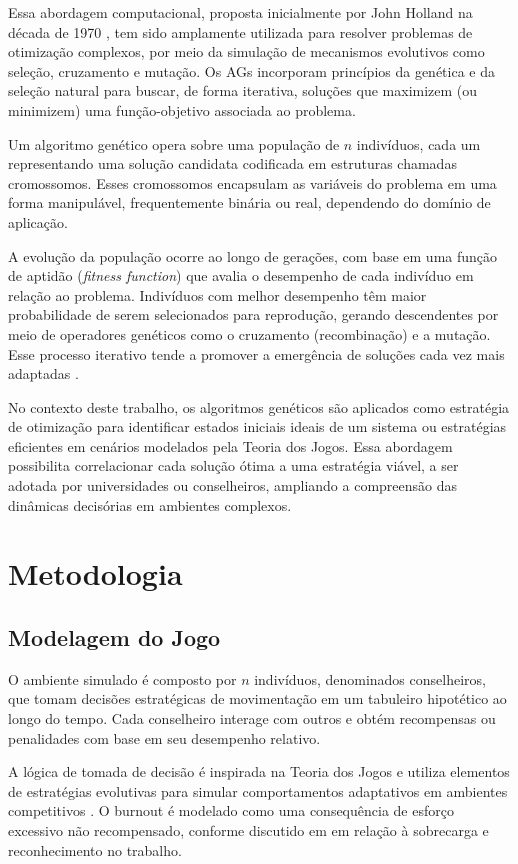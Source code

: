 \documentclass[
	article,			%
	11pt,				%
	oneside,			%
	a4paper,			%
	english,			%
	brazil,				%
	sumario=tradicional
	]{abntex2}
\begin{document}
Essa abordagem computacional, proposta inicialmente por John Holland na década de 1970 \cite{holland1975adaptation}, tem sido amplamente utilizada para resolver problemas de otimização complexos, por meio da simulação de mecanismos evolutivos como seleção, cruzamento e mutação. Os AGs incorporam princípios da genética e da seleção natural para buscar, de forma iterativa, soluções que maximizem (ou minimizem) uma função-objetivo associada ao problema.

Um algoritmo genético opera sobre uma população de \( n\) indivíduos, cada um representando uma solução candidata codificada em estruturas chamadas cromossomos. Esses cromossomos encapsulam as variáveis do problema em uma forma manipulável, frequentemente binária ou real, dependendo do domínio de aplicação.

A evolução da população ocorre ao longo de gerações, com base em uma função de aptidão (\textit{fitness function}) que avalia o desempenho de cada indivíduo em relação ao problema. Indivíduos com melhor desempenho têm maior probabilidade de serem selecionados para reprodução, gerando descendentes por meio de operadores genéticos como o cruzamento (recombinação) e a mutação. Esse processo iterativo tende a promover a emergência de soluções cada vez mais adaptadas \cite{goldberg1989genetic}.

No contexto deste trabalho, os algoritmos genéticos são aplicados como estratégia de otimização para identificar estados iniciais ideais de um sistema ou estratégias eficientes em cenários modelados pela Teoria dos Jogos. Essa abordagem possibilita correlacionar cada solução ótima a uma estratégia viável, a ser adotada por universidades ou conselheiros, ampliando a compreensão das dinâmicas decisórias em ambientes complexos.

\section{Metodologia}
\subsection{Modelagem do Jogo}
O ambiente simulado é composto por \(n \) indivíduos, denominados conselheiros, que tomam decisões estratégicas de movimentação em um tabuleiro hipotético ao longo do tempo. Cada conselheiro interage com outros e obtém recompensas ou penalidades com base em seu desempenho relativo.

\begin{sloppypar}
A lógica de tomada de decisão é inspirada na Teoria dos Jogos \cite{osborne1994game} e utiliza elementos de estratégias evolutivas para simular comportamentos adaptativos em ambientes competitivos \cite{weibull1995evolutionary}. O burnout é modelado como uma consequência de esforço excessivo não recompensado, conforme discutido em \cite{maslach2001burnout} em relação à sobrecarga e reconhecimento no trabalho.
\end{sloppypar}
\end{document}

